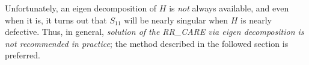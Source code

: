 Unfortunately, an eigen decomposition of $H$ is {\it not} always available, and even when it is, it turns out that $S_{11}$ will be nearly singular
when $H$ is nearly defective.  Thus, in general, {\it solution of the RR_CARE via eigen decomposition is not recommended in practice}; the method
described in the followed section is preferred.


\begin{figure*}[t]

\end{figure*}

